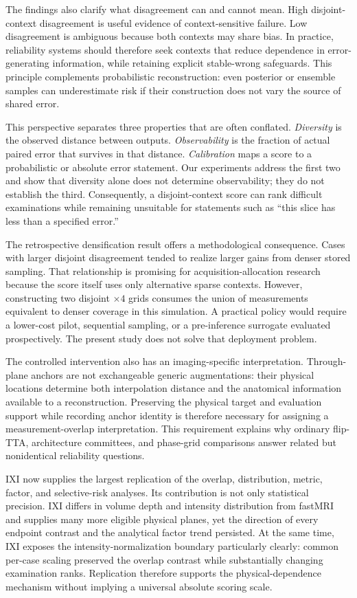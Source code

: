 \documentclass[journal,10pt]{IEEEtran}
\begin{document}
The findings also clarify what disagreement can and cannot mean. High disjoint-context disagreement is useful evidence of context-sensitive failure. Low disagreement is ambiguous because both contexts may share bias. In practice, reliability systems should therefore seek contexts that reduce dependence in error-generating information, while retaining explicit stable-wrong safeguards. This principle complements probabilistic reconstruction: even posterior or ensemble samples can underestimate risk if their construction does not vary the source of shared error.

This perspective separates three properties that are often conflated. \emph{Diversity} is the observed distance between outputs. \emph{Observability} is the fraction of actual paired error that survives in that distance. \emph{Calibration} maps a score to a probabilistic or absolute error statement. Our experiments address the first two and show that diversity alone does not determine observability; they do not establish the third. Consequently, a disjoint-context score can rank difficult examinations while remaining unsuitable for statements such as ``this slice has less than a specified error.''

The retrospective densification result offers a methodological consequence. Cases with larger disjoint disagreement tended to realize larger gains from denser stored sampling. That relationship is promising for acquisition-allocation research because the score itself uses only alternative sparse contexts. However, constructing two disjoint $\times4$ grids consumes the union of measurements equivalent to denser coverage in this simulation. A practical policy would require a lower-cost pilot, sequential sampling, or a pre-inference surrogate evaluated prospectively. The present study does not solve that deployment problem.

The controlled intervention also has an imaging-specific interpretation. Through-plane anchors are not exchangeable generic augmentations: their physical locations determine both interpolation distance and the anatomical information available to a reconstruction. Preserving the physical target and evaluation support while recording anchor identity is therefore necessary for assigning a measurement-overlap interpretation. This requirement explains why ordinary flip-TTA, architecture committees, and phase-grid comparisons answer related but nonidentical reliability questions.

IXI now supplies the largest replication of the overlap, distribution, metric, factor, and selective-risk analyses. Its contribution is not only statistical precision. IXI differs in volume depth and intensity distribution from fastMRI and supplies many more eligible physical planes, yet the direction of every endpoint contrast and the analytical factor trend persisted. At the same time, IXI exposes the intensity-normalization boundary particularly clearly: common per-case scaling preserved the overlap contrast while substantially changing examination ranks. Replication therefore supports the physical-dependence mechanism without implying a universal absolute scoring scale.
\end{document}
